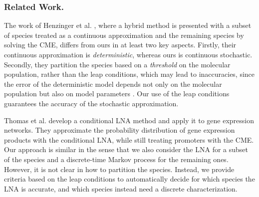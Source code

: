 \documentclass{llncs}
\begin{document}
\subsubsection{Related Work.}
The work of Henzinger et al. \cite{henzinger2010hybrid}, where a hybrid method is presented with a subset of species treated as a continuous approximation and the remaining species by solving the CME, differs from ours in at least two key aspects. 
Firstly, their continuous approximation is \emph{deterministic}, whereas ours is continuous stochastic. Secondly, they partition the species based on a \emph{threshold} on the molecular population, rather than the leap conditions, which may lead to inaccuracies, since the error of the deterministic model depends not only on the molecular population but also on model parameters \cite{ethier2009markov}. %
Our use of the leap conditions guarantees the accuracy of the stochastic approximation. %
{Thomas et al. \cite{thomas2014phenotypic} develop a conditional LNA method and apply it to gene expression networks. They approximate the probability distribution of gene expression products with the conditional LNA, while still treating promoters with the CME. Our approach is similar in the sense that we also consider the LNA for a subset of the species and a discrete-time Markov process for the remaining ones. However, it is not clear in  \cite{thomas2014phenotypic} how to partition the species. Instead, we provide criteria based on the leap conditions to automatically decide for which species the LNA is accurate, and which species instead need a discrete characterization.

}
\end{document}
